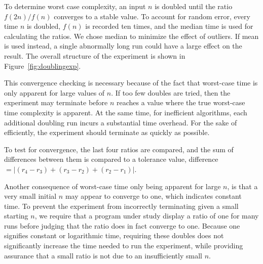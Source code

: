   To determine worst case complexity, an input $n$ is doubled until the
  ratio $f(2n) / f(n)$ converges to a stable value. To account for random
  error, every time $n$ is doubled, $f(n)$ is recorded ten times, and the
  median time is used for calculating the ratios.  We chose
  median to minimize the effect of outliers. If mean is used instead, a
  single abnormally long run could have a large effect on the result. The
  overall structure of the experiment is shown in Figure~\ref{fig:doublingexp}.

  This convergence checking is necessary because of the fact that worst-case
  time is only apparent for large values of $n$. If too few doubles
  are tried, then the experiment may terminate before $n$ reaches a value
  where the true worst-case time complexity is apparent. At the same time,
  for inefficient  algorithms, each additional doubling run incurs a substantial
  time overhead. For the sake of efficiently, the experiment should
  terminate as quickly as possible.

  To test for convergence, the last four ratios are compared, and the
  sum of differences between them is compared to a tolerance value,
  difference $= |(r_4 - r_3) + (r_3 -r_2) + (r_2 - r_1)|$.


  Another consequence of worst-case time only being apparent for large
  $n$, is that a very small initial $n$ may appear to converge to one,
  which indicates constant time. To prevent the
  experiment from incorrectly terminating given a small starting $n$, we
  require that a program under study display a ratio of one for many
  runs before judging that the ratio does in fact converge to one. Because
  one signifies constant or logarithmic
  time, requiring these doubles does not significantly increase the time needed
  to run the experiment, while providing assurance that a small ratio is not due
  to an insufficiently small $n$.
